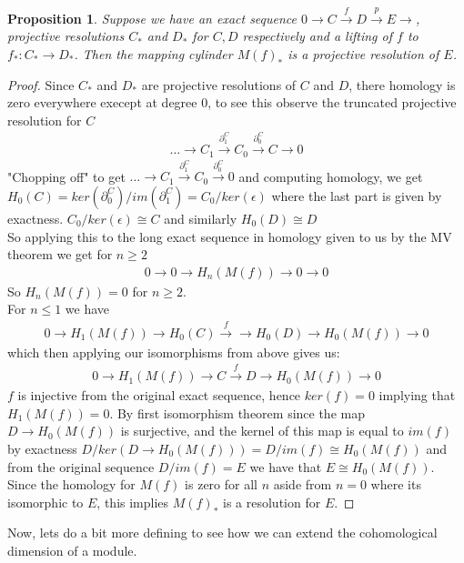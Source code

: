 \documentclass[12pt]{book}
\newtheorem{proposition}[theorem]{Proposition}
\theoremstyle{definition}
\begin{document}
\begin{proposition}\label{mapcyl}
    Suppose we have an exact sequence $0 \rightarrow C \xrightarrow{f} D \xrightarrow{p} E \rightarrow$, projective resolutions $C_*$ and $D_*$ for $C,D$ respectively and a lifting of $f$ to $f_* : C_* \to D_*$. Then the mapping cylinder $M(f)_*$ is a projective resolution of $E$. 
\end{proposition}
\begin{proof}
    Since $C_*$ and $D_*$ are projective resolutions of $C$ and $D$, there homology is zero everywhere execept at degree 0, to see this observe the truncated projective resolution for $C$
    \begin{align*}
        \dots \rightarrow C_1 \xrightarrow{\partial^C_1} C_0 \xrightarrow{\partial^C_0} C \rightarrow 0
    \end{align*}
    "Chopping off" to get $\dots \rightarrow C_1 \xrightarrow{\partial^C_1} C_0 \xrightarrow{\partial^C_0} 0$ and computing homology, we get $H_0(C) = ker(\partial^C_0)/im(\partial^C_1) = C_0/ker(\epsilon)$ where the last part is given by exactness. $C_0/ker(\epsilon) \cong C$ and similarly $H_0(D) \cong D$\\
    So applying this to the long exact sequence in homology given to us by the MV theorem we get for $n \geq 2$
    \begin{align*}
        0 \rightarrow 0 \rightarrow H_n(M(f)) \rightarrow 0 \rightarrow 0 
    \end{align*} 
    So $H_n(M(f)) = 0$ for $n \geq 2$.\\
    For $n \leq 1$ we have 
    \begin{align*}
        0 \rightarrow H_1(M(f)) \rightarrow H_0(C) \xrightarrow{f} \rightarrow H_0(D) \rightarrow H_0(M(f)) \rightarrow 0
    \end{align*}
    which then applying our isomorphisms from above gives us: 
    \begin{align*}
        0 \rightarrow H_1(M(f)) \rightarrow C \xrightarrow{f} D \rightarrow H_0(M(f)) \rightarrow 0
    \end{align*}
    $f$ is injective from the original exact sequence, hence $ker(f) = 0$ implying that $H_1(M(f)) = 0$. By first isomorphism theorem since the map $D \to H_0(M(f))$ is surjective, and the kernel of this map is equal to $im(f)$ by exactness $D/ker(D \to H_0(M(f))) = D/im(f) \cong H_0(M(f))$ and from the original sequence $D/im(f) = E$ we have that $E \cong H_0(M(f))$. \\
    Since the homology for $M(f)$ is zero for all $n$ aside from $n = 0$ where its isomorphic to $E$, this implies $M(f)_*$ is a resolution for $E$.
\end{proof}
Now, lets do a bit more defining to see how we can extend the cohomological dimension of a module.
\end{document}
